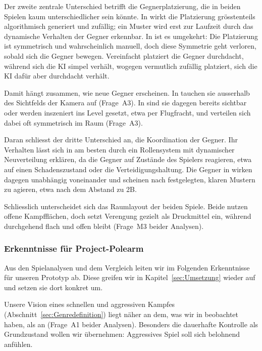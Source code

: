 \documentclass[../Main.tex]{subfiles}
\begin{document}
Der zweite zentrale Unterschied betrifft die Gegnerplatzierung, die in beiden Spielen kaum unterschiedlicher sein könnte. In  wirkt die Platzierung grösstenteils algorithmisch generiert und zufällig; ein Muster wird erst zur Laufzeit durch das dynamische Verhalten der Gegner erkennbar. In  ist es umgekehrt: Die Platzierung ist symmetrisch und wahrscheinlich manuell, doch diese Symmetrie geht verloren, sobald sich die Gegner bewegen. Vereinfacht platziert  die Gegner durchdacht, während sich die KI simpel verhält, wogegen  vermutlich zufällig platziert, sich die KI dafür aber durchdacht verhält.

Damit hängt zusammen, wie neue Gegner erscheinen. In  tauchen sie ausserhalb des Sichtfelds der Kamera auf (Frage~A3). In  sind sie dagegen bereits sichtbar oder werden inszeniert ins Level gesetzt, etwa per Flugfracht, und verteilen sich dabei oft symmetrisch im Raum (Frage~A3).

Daran schliesst der dritte Unterschied an, die Koordination der Gegner. Ihr Verhalten lässt sich in  am besten durch ein Rollensystem mit dynamischer Neuverteilung erklären, da die Gegner auf Zustände des Spielers reagieren, etwa auf einen Schadenszustand oder die Verteidigungshaltung. Die Gegner in  wirken dagegen unabhängig voneinander und scheinen nach festgelegten, klaren Mustern zu agieren, etwa nach dem Abstand zu 2B.

Schliesslich unterscheidet sich das Raumlayout der beiden Spiele. Beide nutzen offene Kampfflächen, doch  setzt Verengung gezielt als Druckmittel ein, während  durchgehend flach und offen bleibt (Frage~M3 beider Analysen).

\subsubsection{Erkenntnisse für Project-Polearm} \label{sec:ErkenntnisseRS}
Aus den Spielanalysen und dem Vergleich leiten wir im Folgenden Erkenntnisse für unseren Prototyp ab. Diese greifen wir in Kapitel~\ref{sec:Umsetzung} wieder auf und setzen sie dort konkret um.

Unsere Vision eines schnellen und aggressiven Kampfes (Abschnitt~\ref{sec:Genredefinition}) liegt näher an dem, was wir in  beobachtet haben, als an  (Frage~A1 beider Analysen). Besonders die dauerhafte Kontrolle als Grundzustand wollen wir übernehmen: Aggressives Spiel soll sich belohnend anfühlen.
\end{document}
